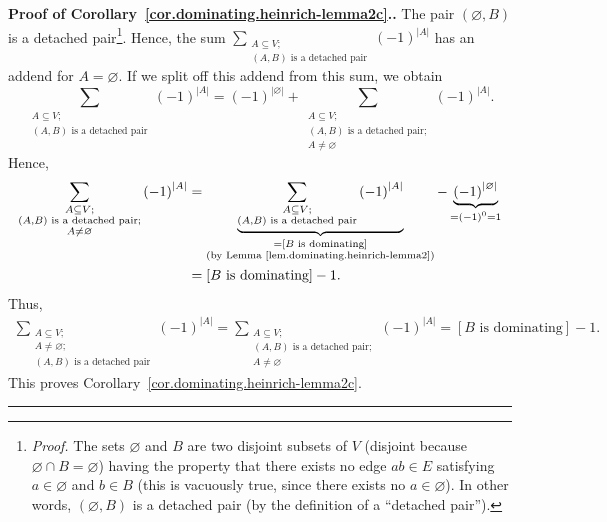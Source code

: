 \documentclass[numbers=enddot,12pt,final,onecolumn,notitlepage]{scrartcl}%
\theoremstyle{definition}
\newenvironment{proof}[1][Proof]{\noindent\textbf{#1.} }{\ \rule{0.5em}{0.5em}}
\let\sumnonlimits\sum
\renewcommand{\sum}{\sumnonlimits\limits}
\newcommand{\abs}[1]{\left| #1 \right|}
\newcommand{\tup}[1]{\left( #1 \right)}
\newcommand{\ive}[1]{\left[ #1 \right]}
\begin{document}
\begin{proof}[Proof of Corollary~\ref{cor.dominating.heinrich-lemma2c}.]
The pair $\tup{\varnothing, B}$ is a detached
pair\footnote{\textit{Proof.} The sets
$\varnothing$ and $B$ are two disjoint subsets of $V$
(disjoint because $\varnothing \cap B = \varnothing$)
having the property that there exists no edge
$ab \in E$ satisfying $a \in \varnothing$ and $b \in B$
(this is vacuously true, since there exists no
$a \in \varnothing$). In other words, $\tup{\varnothing, B}$ is
a detached pair (by the definition of a ``detached pair'').}.
Hence, the sum \newline
$\sum_{\substack{A \subseteq V; \\ \tup{A, B}
\text{ is a detached pair}}} \tup{-1}^{\abs{A}}$
has an addend for $A = \varnothing$. If we split off this addend
from this sum, we obtain
\[
\sum_{\substack{A \subseteq V; \\ \tup{A, B}
\text{ is a detached pair}}} \tup{-1}^{\abs{A}}
=
\tup{-1}^{\abs{\varnothing}}
+
\sum_{\substack{A \subseteq V; \\ \tup{A, B}
\text{ is a detached pair}; \\ A \neq \varnothing}}
\tup{-1}^{\abs{A}} .
\]
Hence,
\begin{align*}
\sum_{\substack{A \subseteq V; \\ \tup{A, B}
\text{ is a detached pair}; \\ A \neq \varnothing}}
\tup{-1}^{\abs{A}}
&=
\underbrace{\sum_{\substack{A \subseteq V; \\ \tup{A, B}
             \text{ is a detached pair}}} \tup{-1}^{\abs{A}}}
           _{\substack{= \ive{B \text{ is dominating}} \\
             \text{(by Lemma~\ref{lem.dominating.heinrich-lemma2})}}}
- \underbrace{\tup{-1}^{\abs{\varnothing}}}_{
                =\tup{-1}^0=1} \\
&= \ive{B \text{ is dominating}} - 1.
\end{align*}
Thus,
\begin{align*}
\sum_{\substack{A \subseteq V; \\ A \neq \varnothing; \\
\tup{A, B} \text{ is a detached pair}}}
\tup{-1}^{\abs{A}}
= \sum_{\substack{A \subseteq V; \\ \tup{A, B}
\text{ is a detached pair}; \\ A \neq \varnothing}}
\tup{-1}^{\abs{A}}
= \ive{B \text{ is dominating}} - 1.
\end{align*}
This proves Corollary~\ref{cor.dominating.heinrich-lemma2c}.
\end{proof}
\end{document}
